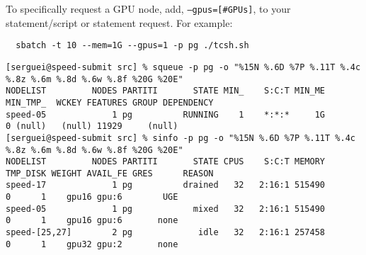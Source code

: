 \noindent To specifically request a GPU node, add, \texttt{--gpus=[\#GPUs]},
to your  statement/script or  statement request.
For example:
\begin{verbatim}
  sbatch -t 10 --mem=1G --gpus=1 -p pg ./tcsh.sh
\end{verbatim}



\footnotesize
\begin{verbatim}
[serguei@speed-submit src] % squeue -p pg -o "%15N %.6D %7P %.11T %.4c %.8z %.6m %.8d %.6w %.8f %20G %20E"
NODELIST         NODES PARTITI       STATE MIN_    S:C:T MIN_ME MIN_TMP_  WCKEY FEATURES GROUP DEPENDENCY
speed-05             1 pg          RUNNING    1    *:*:*     1G        0 (null)   (null) 11929     (null)
[serguei@speed-submit src] % sinfo -p pg -o "%15N %.6D %7P %.11T %.4c %.8z %.6m %.8d %.6w %.8f %20G %20E"
NODELIST         NODES PARTITI       STATE CPUS    S:C:T MEMORY TMP_DISK WEIGHT AVAIL_FE GRES      REASON
speed-17             1 pg          drained   32   2:16:1 515490        0      1    gpu16 gpu:6        UGE
speed-05             1 pg            mixed   32   2:16:1 515490        0      1    gpu16 gpu:6       none
speed-[25,27]        2 pg             idle   32   2:16:1 257458        0      1    gpu32 gpu:2       none
\end{verbatim}
\normalsize

